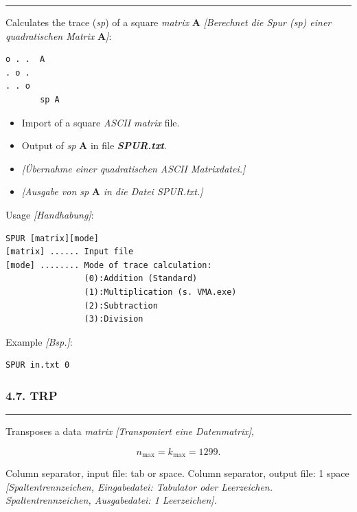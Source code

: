\documentclass[
]{article}
\begin{document}
\begin{center}\rule{0.5\linewidth}{0.5pt}\end{center}

Calculates the trace (\emph{sp}) of a square \emph{matrix}
\(\mathbf{A}\) \emph{{[}Berechnet die Spur (sp) einer quadratischen
Matrix} \(\mathbf{A}\)\emph{{]}}:

\begin{verbatim}
o . .  A
. o .  
. . o
       sp A
\end{verbatim}

\begin{itemize}
\item
  Import of a square \emph{ASCII matrix} file.
\item
  Output of \emph{sp} \(\mathbf{A}\) in file \textbf{\emph{SPUR.txt}}.
\item
  \emph{{[}Übernahme einer quadratischen ASCII Matrixdatei.{]}}
\item
  \emph{{[}Ausgabe von sp} \(\mathbf{A}\) \emph{in die Datei
  SPUR.txt.{]}}
\end{itemize}

Usage \emph{{[}Handhabung{]}}:

\begin{verbatim}
SPUR [matrix][mode] 
[matrix] ...... Input file 
[mode] ........ Mode of trace calculation: 
                (0):Addition (Standard) 
                (1):Multiplication (s. VMA.exe)
                (2):Subtraction
                (3):Division
\end{verbatim}

Example \emph{{[}Bsp.{]}}:

\begin{verbatim}
SPUR in.txt 0
\end{verbatim}

\hypertarget{trp}{%
\subsubsection{4.7. TRP}\label{trp}}

\begin{center}\rule{0.5\linewidth}{0.5pt}\end{center}

Transposes a data \emph{matrix} \emph{{[}Transponiert eine
Datenmatrix{]}},

\[n_{\max} = k_{\max} = 1299.\]

Column separator, input file: tab or space. Column separator, output
file: 1 space \emph{{[}Spaltentrennzeichen, Eingabedatei: Tabulator oder
Leerzeichen. Spaltentrennzeichen, Ausgabedatei: 1 Leerzeichen{]}.}
\end{document}
